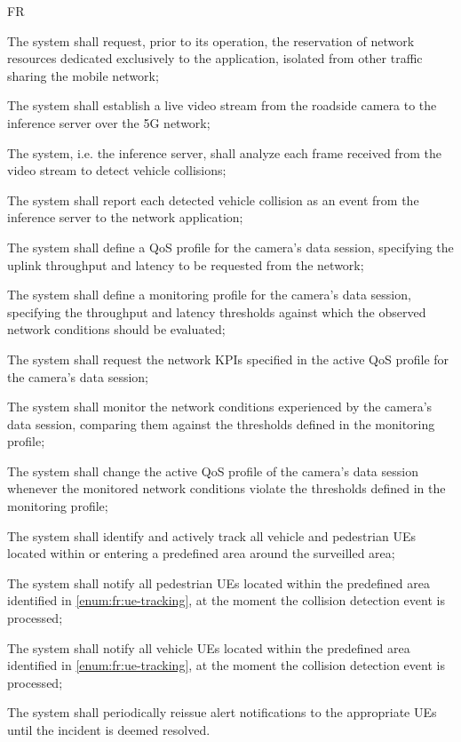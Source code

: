 \begin{custenumerate}{FR}
    \item \label{enum:fr:slice} The system shall request, prior to its operation, the reservation of network resources dedicated exclusively to the application, isolated from other traffic sharing the mobile network;
    \item \label{enum:fr:stream} The system shall establish a live video stream from the roadside camera to the inference server over the \acs{5G} network;
    \item \label{enum:fr:detection} The system, i.e. the inference server, shall analyze each frame received from the video stream to detect vehicle collisions;
    \item \label{enum:fr:detection-event} The system shall report each detected vehicle collision as an event from the inference server to the network application;
    \item \label{enum:fr:qos-profile} The system shall define a \acs{QoS} profile for the camera's data session, specifying the uplink throughput and latency to be requested from the network;
    \item \label{enum:fr:monitoring-profile} The system shall define a monitoring profile for the camera's data session, specifying the throughput and latency thresholds against which the observed network conditions should be evaluated;
    \item \label{enum:fr:qos-request} The system shall request the network \acsp{KPI} specified in the active \acs{QoS} profile for the camera's data session;
    \item \label{enum:fr:monitoring} The system shall monitor the network conditions experienced by the camera's data session, comparing them against the thresholds defined in the monitoring profile;
    \item \label{enum:fr:qos-change} The system shall change the active \acs{QoS} profile of the camera's data session whenever the monitored network conditions violate the thresholds defined in the monitoring profile;
    \item \label{enum:fr:ue-tracking} The system shall identify and actively track all vehicle and pedestrian \acsp{UE} located within or entering a predefined area around the surveilled area;
    \item \label{enum:fr:notify-pedestrians} The system shall notify all pedestrian \acsp{UE} located within the predefined area identified in \ref{enum:fr:ue-tracking}, at the moment the collision detection event is processed;
    \item \label{enum:fr:notify-vehicles} The system shall notify all vehicle \acsp{UE} located within the predefined area identified in \ref{enum:fr:ue-tracking}, at the moment the collision detection event is processed;
    \item \label{enum:fr:notify-periodic} The system shall periodically reissue alert notifications to the appropriate \acsp{UE} until the incident is deemed resolved.
\end{custenumerate}

